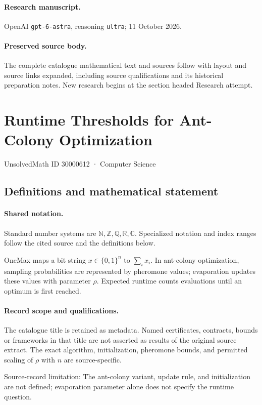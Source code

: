\documentclass[11pt]{article}
\begin{document}
\paragraph{Research manuscript.} OpenAI \texttt{gpt-6-astra}, reasoning \texttt{ultra}; 11 October 2026.
\paragraph{Preserved source body.} The complete catalogue mathematical text and sources follow with layout and source links expanded, including source qualifications and its historical preparation notes. New research begins at the section headed Research attempt.

\section{Runtime Thresholds for Ant-Colony Optimization}\label{30000612}
{\small UnsolvedMath ID 30000612 · Computer Science}
\subsection{Definitions and mathematical statement}

\paragraph{Shared notation.}Standard number systems are $\mathbb N,\mathbb Z,\mathbb Q,\mathbb R,\mathbb C$. Specialized notation and index ranges follow the cited source and the definitions below.


OneMax maps a bit string $x\in\{0,1\}^n$ to $\sum_i x_i$. In ant-colony optimization, sampling probabilities are represented by pheromone values; evaporation updates these values with parameter $\rho$. Expected runtime counts evaluations until an optimum is first reached.
\paragraph{Record scope and qualifications.}
The catalogue title is retained as metadata. Named certificates, contracts, bounds or frameworks in that title are not asserted as results of the original source extract.
The exact algorithm, initialization, pheromone bounds, and permitted scaling of $\rho$ with $n$ are source-specific.

Source-record limitation: The ant-colony variant, update rule, and initialization are not defined; evaporation parameter alone does not specify the runtime question.
\end{document}
